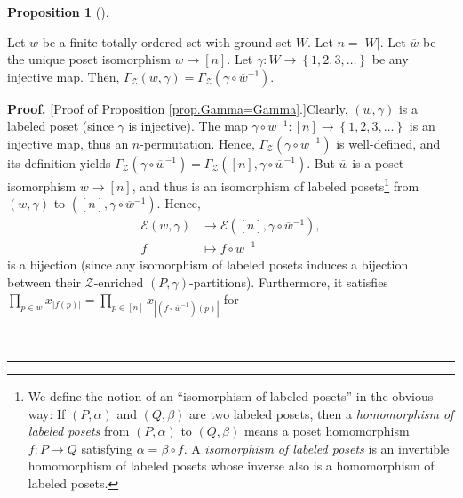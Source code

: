 \documentclass[numbers=enddot,12pt,final,onecolumn,notitlepage]{scrartcl}%
\theoremstyle{definition}
\newtheorem{prop}[theo]{Proposition}
\newenvironment{proposition}[1][]
{\begin{prop}[#1]\begin{leftbar}}
{\end{leftbar}\end{prop}}
\newenvironment{proof}[1][Proof]{\noindent\textbf{#1.} }{\ \rule{0.5em}{0.5em}}
\newenvironment{vershort}{}{}
\let\prodnonlimits\prod
\renewcommand{\prod}{\prodnonlimits\limits}
\begin{document}
\begin{proposition}
\label{prop.Gamma=Gamma}Let $w$ be a finite totally ordered set with ground
set $W$. Let $n=\left\vert W\right\vert $. Let $\overline{w}$ be the unique
poset isomorphism $w\rightarrow\left[  n\right]  $. Let $\gamma:W\rightarrow
\left\{  1,2,3,\ldots\right\}  $ be any injective map. Then, $\Gamma
_{\mathcal{Z}}\left(  w,\gamma\right)  =\Gamma_{\mathcal{Z}}\left(
\gamma\circ\overline{w}^{-1}\right)  $.
\end{proposition}

\begin{proof}
[Proof of Proposition \ref{prop.Gamma=Gamma}.]Clearly,
$\left( w , \gamma \right)$ is a labeled poset (since $\gamma$ is injective).
The map $\gamma\circ\overline
{w}^{-1}:\left[  n\right]  \rightarrow\left\{  1,2,3,\ldots\right\}  $ is an
injective map, thus an $n$-permutation. Hence, $\Gamma_{\mathcal{Z}}\left(
\gamma\circ\overline{w}^{-1}\right)  $ is well-defined, and its definition
yields
$\Gamma_{\mathcal{Z}}\left(  \gamma\circ\overline{w}^{-1}\right)
=\Gamma_{\mathcal{Z}}\left(  \left[  n\right]  ,\gamma\circ\overline{w}%
^{-1}\right)  $.
But $\overline{w}$ is a poset isomorphism $w \to \left[ n \right]$, and
thus is an isomorphism of labeled posets\footnote{We define the notion of
an ``isomorphism of labeled posets'' in the obvious way:
If $\left(P, \alpha\right)$ and $\left(Q, \beta\right)$ are two labeled
posets, then a \textit{homomorphism of labeled posets} from
$\left(P, \alpha\right)$ to $\left(Q, \beta\right)$ means a poset
homomorphism $f : P \to Q$ satisfying $\alpha = \beta \circ f$.
A \textit{isomorphism of labeled posets} is an invertible homomorphism
of labeled posets whose inverse also is a homomorphism of labeled posets.}
from $\left(  w,\gamma\right)$ to $\left(  \left[
n\right]  ,\gamma\circ\overline{w}^{-1}\right)$.
Hence,
\begin{align*}
\mathcal{E}\left(  w,\gamma\right)   &  \rightarrow\mathcal{E}\left(  \left[
n\right]  ,\gamma\circ\overline{w}^{-1}\right)  ,\\
f  &  \mapsto f\circ\overline{w}^{-1}%
\end{align*}
is a bijection (since any isomorphism of labeled posets induces a bijection
between their $\mathcal{Z}$-enriched $\left(P,\gamma\right)$-partitions). %
%
\begin{vershort}
Furthermore, it satisfies $\prod_{p\in w}x_{\left\vert
f\left(  p\right)  \right\vert }=\prod_{p\in\left[  n\right]  }x_{\left\vert
\left(  f\circ\overline{w}^{-1}\right)  \left(  p\right)  \right\vert }$ for

\end{vershort}
\end{proof}
\end{document}
